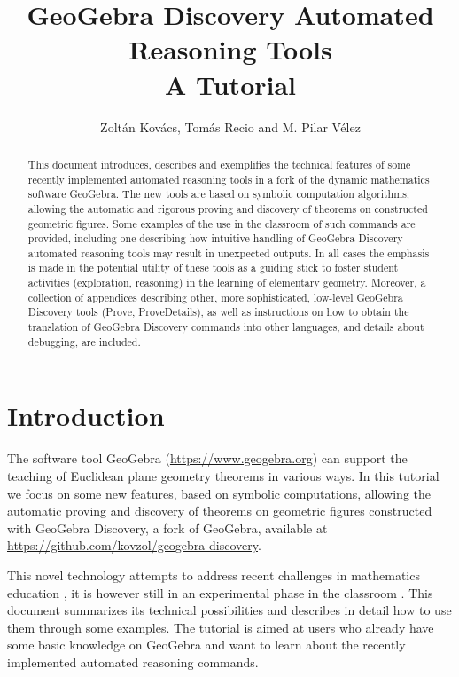 \documentclass{article}
\title{GeoGebra Discovery Automated Reasoning Tools\\ \large A Tutorial}
\author{Zolt\'an Kov\'acs, Tom\'as Recio and M. Pilar V\'elez}
\begin{document}

\newcommand{\mode}[1]{{\raisebox{-.15\height}{\texttt{[image: icons/mode\_\#1.png]}}}}



\maketitle

\begin{abstract}
This document introduces, describes and exemplifies the technical
features of some recently implemented automated reasoning tools
in a fork of the dynamic mathematics software GeoGebra.
The new tools are based on symbolic computation
algorithms, allowing the automatic and rigorous proving and
discovery of theorems on constructed geometric figures.
Some examples of the use in the classroom of such commands
are provided, including one describing how intuitive handling
of GeoGebra Discovery automated reasoning tools may result in
unexpected outputs. In all cases the emphasis is made in the
potential utility of these tools as a guiding stick to foster
student activities (exploration, reasoning) in the learning of
elementary geometry. Moreover, a collection of appendices
describing other, more sophisticated, low-level GeoGebra Discovery
tools (Prove, ProveDetails), as well as instructions on how to
obtain the translation of GeoGebra Discovery commands into other
languages, and details about debugging, are included.
\end{abstract}


\section{Introduction}

The software tool GeoGebra (\url{https://www.geogebra.org}) can support the teaching of Euclidean plane geometry theorems in various ways. In this tutorial we focus on some new features, based on symbolic computations,  allowing the automatic proving and discovery of theorems on geometric figures constructed with GeoGebra
Discovery, a fork of GeoGebra, available at \url{https://github.com/kovzol/geogebra-discovery}.

This novel technology attempts to address recent challenges
in mathematics education \cite{HowsonWilson,Davis,SinclairBartoliniBussiDeVilliersOwens,Quaresma,RichardOllerMeavilla},
it is however still in an experimental phase in the classroom \cite{KovacsRecioRichardVelez,Kovacs2017}.
This document summarizes its technical possibilities and describes in detail how to use them through some examples. The tutorial is aimed at users who already
have some basic knowledge on GeoGebra and want to learn about the recently implemented automated reasoning commands.
\end{document}
